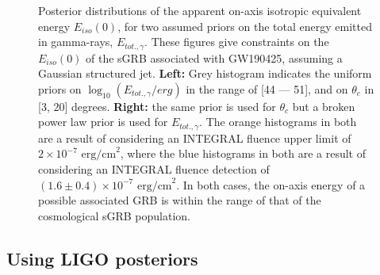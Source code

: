     \begin{figure}[H]
        \begin{subfigure}{0.5\textwidth}
              \label{fig:unif}
              \centering
              \def\svgwidth{\textwidth}
              
        \end{subfigure}%
        \begin{subfigure}{0.5\textwidth}
              \label{fig:bpl}
              \centering
              \def\svgwidth{\textwidth}
              
        \end{subfigure}
        \caption[Posterior distributions of the apparent on-axis isotropic equivalent
        energy $E_{iso}(0)$, for two assumed priors on the total energy emitted in
        gamma-rays, $E_{tot., \gamma}$]{
            Posterior distributions of the apparent on-axis isotropic equivalent energy
            $E_{iso}(0)$, for two assumed priors on the total energy emitted in
            gamma-rays, $E_{tot., \gamma}$. These figures give constraints on the
            $E_{iso}(0)$ of the sGRB associated with GW190425, assuming a Gaussian
            structured jet. \textbf{Left:} Grey histogram indicates the uniform priors
            on $\log_{10}(E_{tot., \gamma}/erg)$ in the range of [44 --- 51], and on
            $\theta_c$ in [3, 20] degrees.  \textbf{Right:} the same prior is used for
            $\theta_c$ but a broken power law prior is used for $E_{tot., \gamma}$. The
            orange histograms in both are a result of considering an INTEGRAL fluence
            upper limit of $2 \times 10^{-7} \text{ erg/cm}^2$, where the blue
            histograms in both are a result of considering an INTEGRAL fluence detection
            of $(1.6 \pm 0.4) \times 10^{-7} \text{ erg/cm}^2$. In both cases, the
            on-axis energy of a possible associated GRB is within the range of that of
            the cosmological sGRB population.
        }
        \label{fig:unif_bpl}
    \end{figure}


    \subsection{Using LIGO posteriors}

